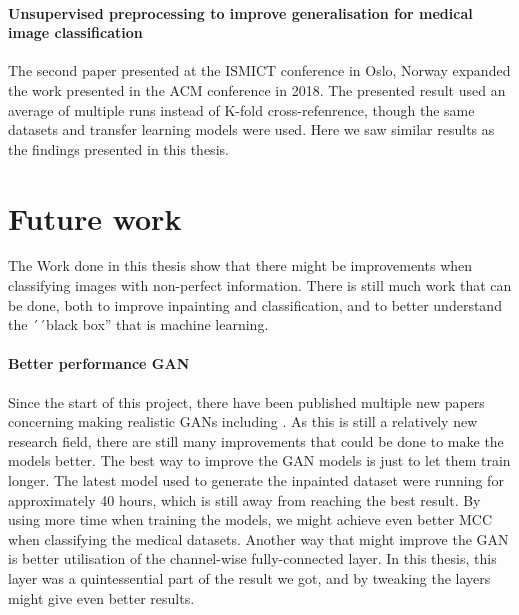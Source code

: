 \paragraph{Unsupervised preprocessing to improve generalisation for medical image classification}
The second paper presented at the ISMICT conference in Oslo, Norway expanded the work presented in the ACM conference in 2018.
The presented result used an average of multiple runs instead of K-fold cross-refenrence, though the same datasets and transfer learning models were used.
Here we saw similar results as the findings presented in this thesis. 







\section{Future work}
The Work done in this thesis show that there might be improvements when classifying images with non-perfect information. There is still much work that can be done, both to improve inpainting and classification, and to better understand the ´´black box'' that is machine learning. 

\paragraph{Better performance GAN}
Since the start of this project, there have been published multiple new papers concerning making realistic GANs including \cite{DBLP:journals/corr/abs-1809-11096} \cite{DBLP:journals/corr/abs-1812-04948}. As this is still a relatively new research field, there are still many improvements that could be done to make the models better.
The best way to improve the GAN models is just to let them train longer. The latest model used to generate the inpainted dataset were running for approximately 40 hours, which is still away from reaching the best result. By using more time when training the models, we might achieve even better MCC when classifying the medical datasets.
Another way that might improve the GAN is better utilisation of the channel-wise fully-connected layer. In this thesis, this layer was a quintessential part of the result we got, and by tweaking the layers might give even better results.

